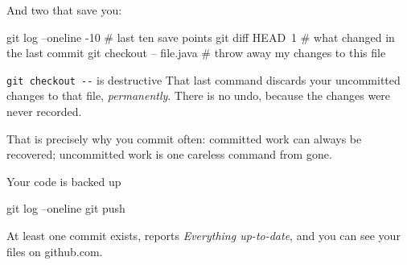 And two that save you:

\begin{shell}
git log --oneline -10         # last ten save points
git diff HEAD~1               # what changed in the last commit
git checkout -- file.java     # throw away my changes to this file
\end{shell}

\begin{trap}{\texttt{git checkout -{}-} is destructive}
That last command discards your uncommitted changes to that file,
\emph{permanently}. There is no undo, because the changes were never recorded.

That is precisely why you commit often: committed work can always be recovered;
uncommitted work is one careless command from gone.
\end{trap}

\begin{checkpoint}{Your code is backed up}
\begin{shell}
git log --oneline
git push
\end{shell}

At least one commit exists,  reports \emph{Everything up-to-date},
and you can see your files on github.com.
\end{checkpoint}
